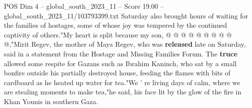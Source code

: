\begin{textsample}{POS Dim 4 – global\_south\_2023\_11 – Score 19.00 – global\_south\_2023\_11/103793399.txt}
Saturday also brought hours of waiting for the families of hostages, some of whose joy was tempered by the continued captivity of others."My heart is split because my son, @ @ @ @ @ @ @ @ @ @,"Mirit Regev, the mother of Maya Regev, who was \textbf{released} late on Saturday, said in a statement from the Hostage and Missing Families Forum.
The \textbf{truce} allowed some respite for Gazans such as Ibrahim Kaninch, who sat by a small bonfire outside his partially destroyed house, feeding the flames with bits of cardboard as he heated up water for tea."We ' re living days of calm, where we are stealing moments to make tea,"he said, his face lit by the glow of the fire in Khan Younis in southern Gaza.

\end{textsample}
